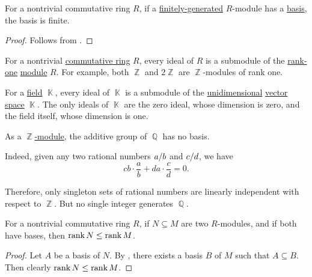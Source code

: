 \begin{corollary}\label{thm:finitely_generated_module_basis}
  For a nontrivial commutative ring \( R \), if a \hyperref[def:module_presentation]{finitely-generated} \( R \)-module has a \hyperref[def:hamel_basis]{basis}, the basis is finite.
\end{corollary}
\begin{proof}
  Follows from .
\end{proof}

\begin{example}\label{ex:field_submodules}
  For a nontrivial \hyperref[def:ring/commutative]{commutative ring} \( R \), every ideal of \( R \) is a submodule of the \hyperref[thm:commutative_module_rank]{rank-one} \hyperref[def:module]{module} \( R \). For example, both \( \BbbZ \) and \( 2\BbbZ \) are \( \BbbZ \)-modules of rank one.

  For a \hyperref[def:field]{field} \( \BbbK \), every ideal of \( \BbbK \) is a submodule of the \hyperref[thm:vector_space_dimension]{unidimensional} \hyperref[def:vector_space]{vector space} \( \BbbK \). The only ideals of \( \BbbK \) are the zero ideal, whose dimension is zero, and the field itself, whose dimension is one.
\end{example}

\begin{example}\label{ex:module_without_basis}
  As a \hyperref[thm:abelian_group_is_module]{\( \BbbZ \)-module}, the additive group of \( \BbbQ \) has no basis.

  Indeed, given any two rational numbers \( a / b \) and \( c / d \), we have
  \begin{equation*}
    cb \cdot \frac a b + da \cdot \frac c d = 0.
  \end{equation*}

  Therefore, only singleton sets of rational numbers are linearly independent with respect to \( \BbbZ \). But no single integer generates \( \BbbQ \).
\end{example}

\begin{proposition}\label{thm:module_rank_monotonicity}
  For a nontrivial commutative ring \( R \), if \( N \subseteq M \) are two \( R \)-modules, and if both have bases, then \( \operatorname{rank} N \leq \operatorname{rank} M \).
\end{proposition}
\begin{proof}
  Let \( A \) be a basis of \( N \). By , there exists a basis \( B \) of \( M \) such that \( A \subseteq B \). Then clearly \( \operatorname{rank} N \leq \operatorname{rank} M \).
\end{proof}

